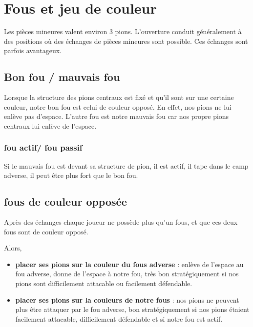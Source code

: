 

%

\section{Fous et jeu de couleur}
%
Les pièces mineures valent environ 3 pions.
L'ouverture conduit généralement à des positions où des échanges de pièces mineures sont possible.
Ces échanges sont parfois avantageux.

\subsection{Bon fou / mauvais fou}
%
Lorsque la structure des pions centraux est fixé et qu'il sont sur une certaine couleur, notre bon fou est celui de couleur opposé. En effet, nos pions ne lui enlève pas d'espace. L'autre fou est notre mauvais fou car nos propre pions centraux lui enlève de l'espace.
\subsubsection{fou actif/ fou passif}
Si le mauvais fou est devant sa structure de pion, il est actif, il tape dans le camp adverse, il peut être plus fort que le bon fou.
\subsection{fous de couleur opposée}
Après des échanges chaque joueur ne possède plus qu'un fous, et  que ces deux fous sont de couleur opposé.

Alors,

\begin{itemize}[leftmargin=1.7cm, label=, itemsep=0pt]%
\item  {\bf placer ses pions sur la couleur du fous adverse} : enlève de l'espace au fou adverse, donne de l'espace à notre fou, très bon stratégiquement si nos pions sont difficilement attacable ou facilement défendable.
\item  {\bf placer ses pions sur la couleurs de notre fous} : nos pions ne peuvent plus être attaquer par le fou adverse, bon stratégiquement si nos pions étaient facilement attacable, difficilement défendable et si notre fou est actif.
\end{itemize}




